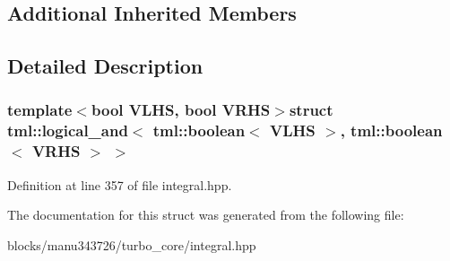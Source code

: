 \subsection*{Additional Inherited Members}


\subsection{Detailed Description}
\subsubsection*{template$<$bool V\+L\+H\+S, bool V\+R\+H\+S$>$struct tml\+::logical\+\_\+and$<$ tml\+::boolean$<$ V\+L\+H\+S $>$, tml\+::boolean$<$ V\+R\+H\+S $>$ $>$}



Definition at line 357 of file integral.\+hpp.



The documentation for this struct was generated from the following file\+:\begin{DoxyCompactItemize}
\item 
blocks/manu343726/turbo\+\_\+core/integral.\+hpp\end{DoxyCompactItemize}
